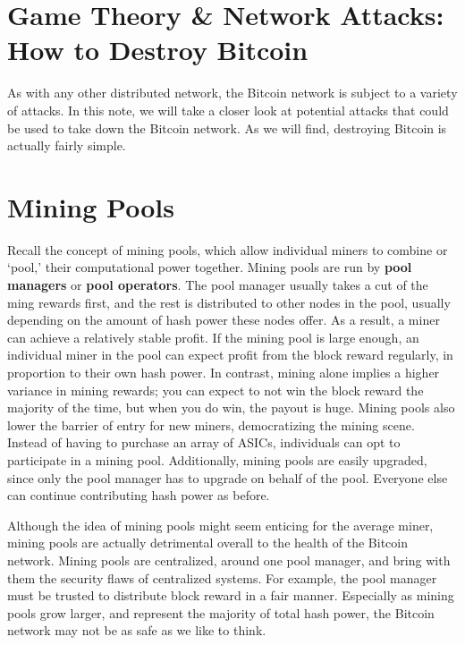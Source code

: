\documentclass[full.tex]{subfiles}
\begin{document}
    \thispagestyle{firstpage}
    \vspace*{3\baselineskip}
    \section*{Game Theory \& Network Attacks: How to Destroy Bitcoin}
    
    As with any other distributed network, the Bitcoin network is subject to a variety of attacks. In this note, we will take a closer look at potential attacks that could be used to take down the Bitcoin network. As we will find, destroying Bitcoin is actually fairly simple.
    
    \section*{Mining Pools}
    
    Recall the concept of mining pools, which allow individual miners to combine or `pool,' their computational power together. Mining pools are run by \textbf{pool managers} or \textbf{pool operators}. The pool manager usually takes a cut of the ming rewards first, and the rest is distributed to other nodes in the pool, usually depending on the amount of hash power these nodes offer. As a result, a miner can achieve a relatively stable profit. If the mining pool is large enough, an individual miner in the pool can expect profit from the block reward regularly, in proportion to their own hash power. In contrast, mining alone implies a higher variance in mining rewards; you can expect to not win the block reward the majority of the time, but when you do win, the payout is huge. Mining pools also lower the barrier of entry for new miners, democratizing the mining scene. Instead of having to purchase an array of ASICs, individuals can opt to participate in a mining pool. Additionally, mining pools are easily upgraded, since only the pool manager has to upgrade on behalf of the pool. Everyone else can continue contributing hash power as before.
    
    Although the idea of mining pools might seem enticing for the average miner, mining pools are actually detrimental overall to the health of the Bitcoin network. Mining pools are centralized, around one pool manager, and bring with them the security flaws of centralized systems. For example, the pool manager must be trusted to distribute block reward in a fair manner. Especially as mining pools grow larger, and represent the majority of total hash power, the Bitcoin network may not be as safe as we like to think.
    
\end{document}
